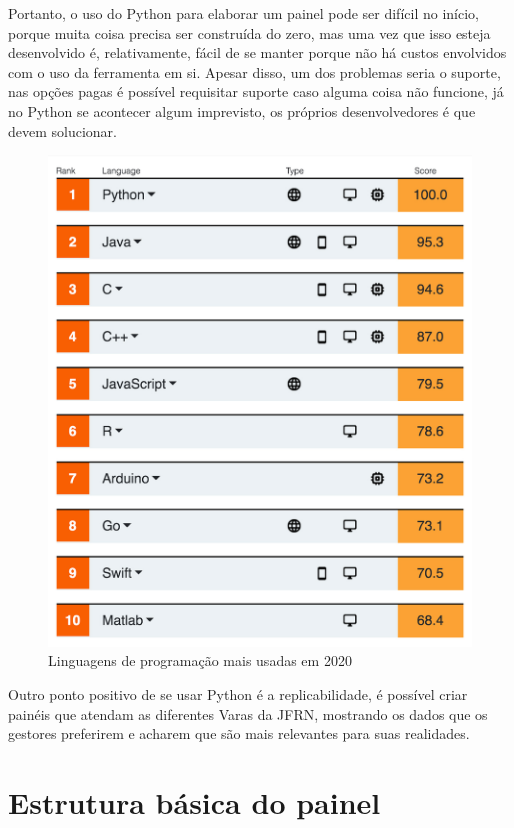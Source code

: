 Portanto, o uso do Python para elaborar um painel pode ser difícil no início, porque muita coisa precisa ser construída do zero, mas uma vez que isso esteja desenvolvido é, relativamente, fácil de se manter porque não há custos envolvidos com o uso da ferramenta em si. Apesar disso, um dos problemas seria o suporte, nas opções pagas é possível requisitar suporte caso alguma coisa não funcione, já no Python se acontecer algum imprevisto, os próprios desenvolvedores é que devem solucionar.

\begin{figure}[h]
	\centering
	\includegraphics[scale=0.25]{./figures/cap2/ranking_python.jpeg}
	\caption{Linguagens de programação mais usadas em 2020}
\end{figure}

Outro ponto positivo de se usar Python é a replicabilidade, é possível criar painéis que atendam as diferentes Varas da JFRN, mostrando os dados que os gestores preferirem e acharem que são mais relevantes para suas realidades.

\section{Estrutura básica do painel}

